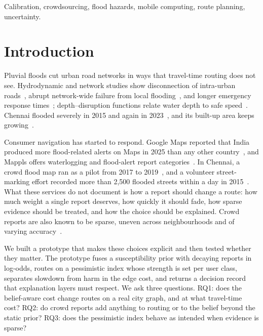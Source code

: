 \documentclass[conference]{IEEEtran}
\begin{document}
\begin{IEEEkeywords}
Calibration, crowdsourcing, flood hazards, mobile computing, route planning, uncertainty.
\end{IEEEkeywords}

\section{Introduction}
Pluvial floods cut urban road networks in ways that travel-time routing does not see. Hydrodynamic and network studies show disconnection of intra-urban roads~\cite{yin2016shanghai,zhou2022connectivity}, abrupt network-wide failure from local flooding~\cite{wang2019percolation}, and longer emergency response times~\cite{green2017emergency,coles2017york}; depth--disruption functions relate water depth to safe speed~\cite{pregnolato2017depth}. Chennai flooded severely in 2015 and again in 2023~\cite{vanoldenborgh2016chennai,radhakrishnan2024chennai}, and its built-up area keeps growing~\cite{devi2019sprawl}.

Consumer navigation has started to respond. Google Maps reported that India produced more flood-related alerts on Maps in 2025 than any other country~\cite{ramani2025maps}, and Mappls offers waterlogging and flood-alert report categories~\cite{mappls2026post}. In Chennai, a crowd flood map ran as a pilot from 2017 to 2019~\cite{urbanrisklab2019riskmap}, and a volunteer street-marking effort recorded more than 2,500 flooded streets within a day in 2015~\cite{naik2016flooded}. What these services do not document is how a report should change a route: how much weight a single report deserves, how quickly it should fade, how sparse evidence should be treated, and how the choice should be explained. Crowd reports are also known to be sparse, uneven across neighbourhoods and of varying accuracy~\cite{senaratne2017vgi,esparza2023imbalance,liu2023wazecoverage}.

We built a prototype that makes these choices explicit and then tested whether they matter. The prototype fuses a susceptibility prior with decaying reports in log-odds, routes on a pessimistic index whose strength is set per user class, separates slowdown from harm in the edge cost, and returns a decision record that explanation layers must respect. We ask three questions. RQ1: does the belief-aware cost change routes on a real city graph, and at what travel-time cost? RQ2: do crowd reports add anything to routing or to the belief beyond the static prior? RQ3: does the pessimistic index behave as intended when evidence is sparse?
\end{document}
